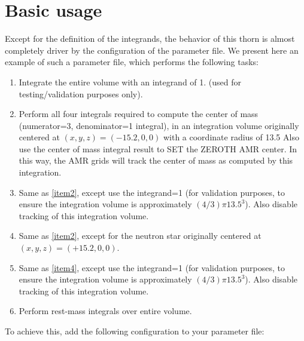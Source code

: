\section{Basic usage}
\label{sec:basic_usage}

Except for the definition of the integrands, the behavior of this thorn
is almost completely driver by the configuration of the parameter file.
We present here an example of such a parameter file, which performs the
following tasks:

\begin{enumerate}
  \setlength{\itemsep}{0.0pt}
  \setlength{\parskip}{0.0pt}
  \setlength{\parsep}{ 0.0pt}
  \item Integrate the entire volume with an integrand of 1.
  (used for testing/validation purposes only).
  \label{item1}

  \item Perform all four integrals required to compute the
  center of mass (numerator=3, denominator=1 integral),
  in an integration volume originally centered at
  $(x,y,z)=(-15.2,0,0)$ with a coordinate radius of 13.5
  Also use the center of mass integral result to SET
  the ZEROTH AMR center. In this way, the AMR grids
  will track the center of mass as computed by this
  integration.
  \label{item2}

  \item Same as \ref{item2}, except use the integrand=1 (for validation
  purposes, to ensure the integration volume is
  approximately $(4/3)\pi13.5^3$). Also disable tracking of
  this integration volume.
  \label{item3}

  \item Same as \ref{item2}, except for the neutron star originally
  centered at $(x,y,z)=(+15.2,0,0)$.
  \label{item4}

  \item Same as \ref{item4}, except use the integrand=1 (for validation
  purposes, to ensure the integration volume is
  approximately $(4/3)\pi13.5^3$). Also disable tracking of
  this integration volume.
  \label{item5}

  \item Perform rest-mass integrals over entire volume.
  \label{item6}
\end{enumerate}
To achieve this, add the following configuration to your parameter file:
